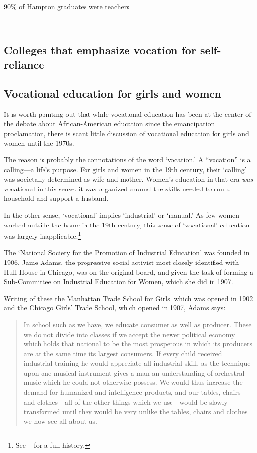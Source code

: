 90\% of Hampton graduates were teachers ~\citep[p. 32]{Spivey:1978un}

~\citep{Meier:1962br}

\subsection{Colleges that emphasize vocation for self-reliance}
\label{collegesthatemphasizevocationforself-reliance}

\subsection{Vocational education for girls and women}
\label{vocationaleducationforgirlsandwomen}

It is worth pointing out that while vocational education has been at the center of the debate about African-American education since the emancipation proclamation, there is scant little discussion of vocational education for girls and women until the 1970s. 

The reason is probably the connotations of the word `vocation.' A ``vocation'' is a calling---a life's purpose. For girls and women in the 19th century, their `calling' was societally determined as wife and mother. Women's education in that era \emph{was} vocational in this sense: it was organized around the skills needed to run a household and support a husband.

In the other sense, `vocational' implies `industrial' or `manual.' As few women worked outside the home in the 19th century, this sense of `vocational' education was largely inapplicable.\footnote{See ~\citep{Powers:2012wk} for a full history.}

The `National Society for the Promotion of Industrial Education' was founded in 1906. Jame Adams, the progressive social activist most closely identified with Hull House in Chicago, was on the original board, and given the task of forming a Sub-Committee on Industrial Education for Women, which she did in 1907. 

Writing of these the Manhattan Trade School for Girls, which was opened in 1902 and the Chicago Girls' Trade School, which opened in 1907, Adams says:

\begin{quote}

In school such as we have, we educate consumer as well as producer. These we do not divide into classes if we accept the newer political economy which holds that national to be the most prosperous in which its producers are at the same time its largest consumers. If every child received industrial training he would appreciate all industrial skill, as the technique upon one musical instrument gives a man an understanding of orchestral music which he could not otherwise possess. We would thus increase the demand for humanized and intelligence products, and our tables, chairs and clothes---all of the other things which we use---would be slowly transformed until they would be very unlike the tables, chairs and clothes we now see all about us. ~\citep[p. 42]{Adams:1907ux}
\end{quote}

